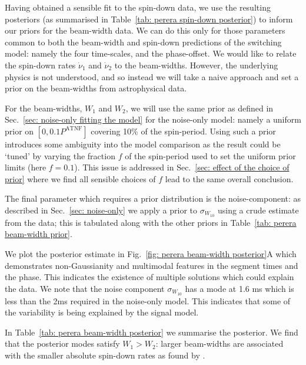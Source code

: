 \documentclass[../full_thesis/full_thesis.tex]{subfiles}
\newcommand{\thisdir}{../comparing_periodic_modulations}
\newcommand{\PATNF}{P^{\mathrm{ATNF}}}
\newcommand{\nudotOne}{\dot{\nu}_{1}}
\newcommand{\nudotTwo}{\dot{\nu}_{2}}
\newcommand{\Wone}{W_{1}}
\newcommand{\Wtwo}{W_{2}}
\newcommand{\bigfigurecaptions}[2]{
$\textbf{A}$: The estimated marginal posterior probability distribution for the
#1 #2 model parameters. $\textbf{B}$: Checking the fit of the model using the
maximum posterior values to the data; see Fig.~\ref{fig: noise-only beam-width
posterior fit} for a complete description.}
\begin{document}
Having obtained a sensible fit to the spin-down data, we use the resulting
posteriors (as summarised in Table~\ref{tab: perera spin-down posterior}) to
inform our priors for the beam-width data. We can do this only for those
parameters common to both the beam-width and spin-down predictions of the
switching model: namely the four time-scales, and the phase-offset. We would
like to relate the spin-down rates $\nudotOne$ and $\nudotTwo$ to the
beam-widths. However, the underlying physics is not
understood, and so instead we will take a naive approach and set a prior on the
beam-widths from astrophysical data.

For the beam-widths, $\Wone$ and $\Wtwo$, we will use the same prior as defined
in Sec.~\ref{sec: noise-only fitting the model} for the noise-only model:
namely a uniform prior on $[0, 0.1\PATNF]$ covering 10\% of the spin-period.
Using such a prior introduces some ambiguity into the model comparison as the
result could be `tuned' by varying the fraction $f$ of the spin-period used to
set the uniform prior limits (here $f=0.1$). This issue is addressed in
Sec.~\ref{sec: effect of the choice of prior} where we find all sensible
choices of $f$ lead to the same overall conclusion.

The final parameter which
requires a prior distribution is the noise-component: as described in
Sec.~\ref{sec: noise-only} we apply a prior to $\sigma_{W_{10}}$ using a crude
estimate from the data; this is tabulated along with the other priors in
Table~\ref{tab: perera beam-width prior}.
\begin{table}
\centering
\caption{Prior distributions for the beam-width switching model. Parameters
for which the prior is taken from spin-down posteriors are labelled by $^{*}$.}
\label{tab: perera beam-width prior}

\end{table}

We plot the posterior estimate
in Fig.~\ref{fig: perera beam-width posterior}A which demonstrates
non-Gaussianity and multimodal features in the segment times and the
phase. This indicates the existence of multiple solutions which could explain the
data. We note that the noise component $\sigma_{W_{10}}$ has a mode at 1.6 ms
which is less than the 2ms required in the noise-only model. This indicates
that some of the variability is being explained by the signal model.
\begin{figure*}
\centering
\texttt{[image: \{Beamwidth\_Switching\_0.1\_PosteriorWithFit]}.pdf}
\caption{\bigfigurecaptions{Switching}{beam-width}}
\label{fig: perera beam-width posterior}
\end{figure*}
In Table~\ref{tab: perera beam-width posterior} we summarise the posterior. We
find that the posterior modes satisfy $\Wone > \Wtwo$: larger
beam-widths are associated with the smaller absolute spin-down rates as found
by \citet{Lyne2010}.
\begin{table}
\centering
\caption{Posterior estimates for the beam-width switching model.}
\label{tab: perera beam-width posterior}

\end{table}
\end{document}
